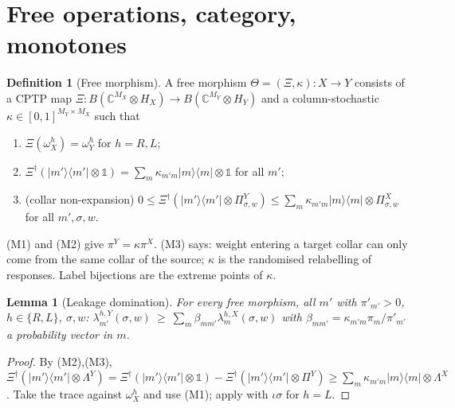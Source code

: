 \documentclass[11pt]{article}
\newtheorem{lemma}[theorem]{Lemma}
\theoremstyle{definition}
\newtheorem{definition}{Definition}
\theoremstyle{remark}
\newcommand{\one}{\mathbb{1}}
\begin{document}
\section{Free operations, category, monotones}
\label{sec:rt}

\begin{definition}[Free morphism]\label{def:mor}
A free morphism $\Theta=(\Xi,\kappa):X\to Y$ consists of a CPTP map $\Xi:B(\mathbb{C}^{M_X}\!\otimes H_X)\to B(\mathbb{C}^{M_Y}\!\otimes H_Y)$ and a column-stochastic $\kappa\in[0,1]^{M_Y\times M_X}$ such that
\begin{enumerate}
\item[(M1)] $\Xi(\omega^h_X)=\omega^h_Y$ for $h=R,L$;
\item[(M2)] $\Xi^\dagger(|m'\rangle\!\langle m'|\otimes\one)=\sum_m\kappa_{m'm}|m\rangle\!\langle m|\otimes\one$ for all $m'$;
\item[(M3)] (collar non-expansion) $0\le\Xi^\dagger(|m'\rangle\!\langle m'|\otimes\Pi^Y_{\sigma,w})\le\sum_m\kappa_{m'm}|m\rangle\!\langle m|\otimes\Pi^X_{\sigma,w}$ for all $m',\sigma,w$.
\end{enumerate}
\end{definition}
(M1) and (M2) give $\pi^Y=\kappa\pi^X$. (M3) says: weight entering a target collar can only come from the same collar of the source; $\kappa$ is the randomised relabelling of responses. Label bijections are the extreme points of $\kappa$.

\begin{lemma}[Leakage domination]\label{lem:dom}
For every free morphism, all $m'$ with $\pi'_{m'}>0$, $h\in\{R,L\}$, $\sigma,w$:
$\lambda^{h,Y}_{m'}(\sigma,w)\ \ge\ \sum_m\beta_{mm'}\lambda^{h,X}_m(\sigma,w)$ with $\beta_{mm'}=\kappa_{m'm}\pi_m/\pi'_{m'}$ a probability vector in $m$.
\end{lemma}
\begin{proof}
By (M2),(M3), $\Xi^\dagger(|m'\rangle\!\langle m'|\otimes\Lambda^Y)=\Xi^\dagger(|m'\rangle\!\langle m'|\otimes\one)-\Xi^\dagger(|m'\rangle\!\langle m'|\otimes\Pi^Y)\ge\sum_m\kappa_{m'm}|m\rangle\!\langle m|\otimes\Lambda^X$. Take the trace against $\omega^h_X$ and use (M1); apply with $\iota\sigma$ for $h=L$.
\end{proof}
\end{document}
